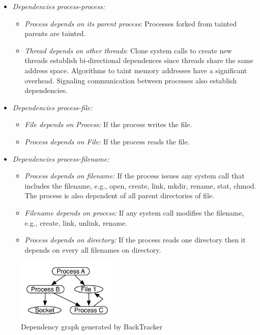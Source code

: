 \begin{itemize}
  \item \textit{Dependencies process-process:}
  \begin{itemize}
    \item \textit{Process depends on its parent process}: Processes forked from tainted parents are tainted.
    \item \textit{Thread depends on other threads}: Clone system calls to create new threads establish bi-directional dependences since threads share the same address space. Algorithms to taint memory addresses \cite{bezoar} have a significant overhead. Signaling communication between processes also establish dependencies.
  \end{itemize}
  \item \textit{Dependencies process-file:}
  \begin{itemize}
    \item \textit{File depends on Process:} If the process writes the file.
    \item \textit{Process depends on File:} If the process reads the file. 
  \end{itemize}
  
  \item \textit{Dependencies process-filename:}
  \begin{itemize}
    \item \textit{Process depends on filename:} If the process issues any system call that includes the filename, e.g., open, create, link, mkdir, rename, stat, chmod. The process is also dependent of all parent directories of file.
    \item \textit{Filename depends on process:} If any system call modifies the filename, e.g., create, link, unlink, rename.
    \item \textit{Process depends on directory:} If the process reads one directory then it depends on every all filenames on directory.
  \end{itemize}
\end{itemize}

\begin{figure}
  \includegraphics[height=30mm]{images/depGraph}
  \centering
  \caption{Dependency graph generated by BackTracker}
  \label{fig:graph}
\end{figure}

